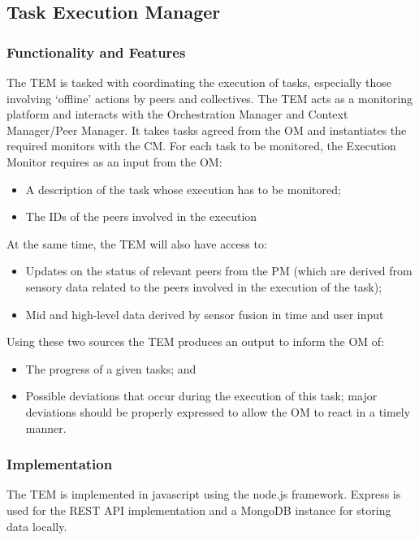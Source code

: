 \subsection{Task Execution Manager}
\subsubsection{Functionality and Features}
The TEM is tasked with coordinating the execution of tasks, especially those involving `offline' actions by peers and collectives. The TEM acts as a monitoring platform and interacts with the Orchestration Manager and Context Manager/Peer Manager. It takes tasks agreed from the OM and instantiates the required monitors with the CM.
For each task to be monitored, the Execution Monitor requires as an input from the OM:
\begin{itemize} 
\item A description of the task whose execution has to be monitored; 
\item The IDs of the peers involved in the execution
\end{itemize}
At the same time, the TEM will also have access to:
\begin{itemize}
\item Updates on the status of relevant peers from the PM (which are derived from sensory data related to the peers involved in the execution of the task);
\item Mid and high-level data derived by sensor fusion in time and user input
\end{itemize}
Using these two sources the TEM produces an output to inform the OM of:
\begin{itemize}
\item The progress of a given tasks; and
\item Possible deviations that occur during the execution of this task; major deviations should be properly expressed to allow the OM to react in a timely manner.
\end{itemize}
\subsubsection{Implementation}
The TEM is implemented in javascript using the node.js framework. Express is used for the REST API implementation and a MongoDB instance for storing data locally.

